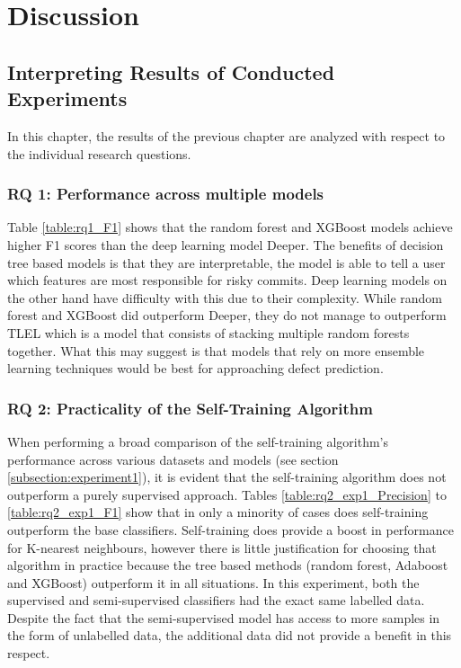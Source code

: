 \documentclass[../main.tex]{subfiles}
\begin{document}
\chapter{Discussion}

\section{Interpreting Results of Conducted Experiments}

In this chapter, the results of the previous chapter are analyzed with respect to the individual research questions. 

\subsection{RQ 1: Performance across multiple models}

Table \ref{table:rq1_F1} shows that the random forest and XGBoost models achieve higher F1 scores than the deep learning model Deeper. The benefits of decision tree based models is that they are interpretable, the model is able to tell a user which features are most responsible for risky commits. Deep learning models on the other hand have difficulty with this due to their complexity. While random forest and XGBoost did outperform Deeper, they do not manage to outperform TLEL which is a model that consists of stacking multiple random forests together. What this may suggest is that models that rely on more ensemble learning techniques would be best for approaching defect prediction. 

\subsection{RQ 2: Practicality of the Self-Training Algorithm}

When performing a broad comparison of the self-training algorithm's performance across various datasets and models (see section \ref{subsection:experiment1}), it is evident that the self-training algorithm does not outperform a purely supervised approach. Tables \ref{table:rq2_exp1_Precision} to \ref{table:rq2_exp1_F1} show that in only a minority of cases does self-training outperform the base classifiers. Self-training does provide a boost in performance for K-nearest neighbours, however there is little justification for choosing that algorithm in practice because the tree based methods (random forest, Adaboost and XGBoost) outperform it in all situations.  In this experiment, both the supervised and semi-supervised classifiers had the exact same labelled data. Despite the fact that the semi-supervised model has access to more samples in the form of unlabelled data, the additional data did not provide a benefit in this respect.
\end{document}
